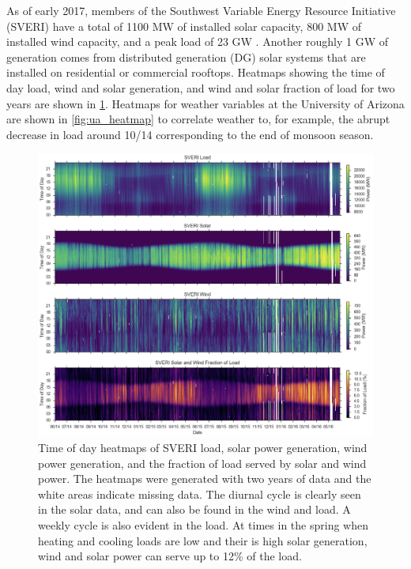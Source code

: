 As of early 2017, members of the Southwest Variable Energy Resource
Initiative (SVERI) have a total of 1100 MW of installed solar capacity,
800 MW of installed wind capacity, and a peak load of 23 GW
\citep{sveri_website}.
Another roughly 1 GW of generation comes from distributed generation
(DG) solar systems that are installed on residential or commercial
rooftops.
Heatmaps showing the time of day load, wind and solar generation, and
wind and solar fraction of load for two years are shown in
\cref{fig:sveri_heatmap}.
Heatmaps for weather variables at the University of Arizona are shown
in \cref{fig:ua_heatmap} to correlate weather to, for example, the
abrupt decrease in load around 10/14 corresponding to the end of monsoon season.

\begin{figure}[p]
\centering
\includegraphics[width=\textwidth]{figs/sveri_heat.png}
\caption[Heatmaps of SVERI load, solar power, wind power, and
renewable load fraction]{Time of day heatmaps of SVERI load, solar
  power generation, wind power generation, and the fraction of load
  served by solar and wind power. The heatmaps were generated with two
  years of data and the white areas indicate missing data. The diurnal
  cycle is clearly seen in the solar data, and can also be found in
  the wind and load. A weekly cycle is also evident in the load. At
  times in the spring when heating and cooling loads are low and their
  is high solar generation, wind and solar power can serve up to 12\%
  of the load.}
\label{fig:sveri_heatmap}
\end{figure}

